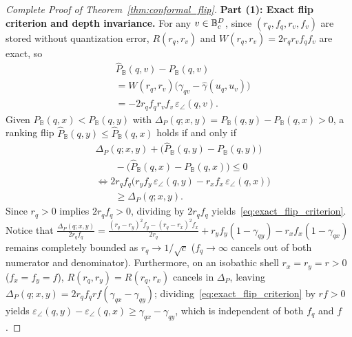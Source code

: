 \begin{proof}[Complete Proof of Theorem~\ref{thm:conformal_flip}]
\textbf{Part (1): Exact flip criterion and depth invariance.}
For any $v \in \mathbb{B}_c^D$, since $(r_q, f_q, r_v, f_v)$ are stored without quantization error, $R(r_q, r_v)$ and $W(r_q, r_v) = 2 r_q r_v f_q f_v$ are exact, so
\begin{equation}
  \begin{aligned}
    &\widehat{P}_{\mathbb{B}}(q, v) - P_{\mathbb{B}}(q, v) \\
    &= W(r_q, r_v)\bigl(\gamma_{qv} - \hat{\gamma}(u_q, u_v)\bigr) \\
    &= -2 r_q f_q r_v f_v\,\varepsilon_\angle(q, v).
  \end{aligned}
\end{equation}
Given $P_{\mathbb{B}}(q, x) < P_{\mathbb{B}}(q, y)$ with $\Delta_P(q; x, y) = P_{\mathbb{B}}(q, y) - P_{\mathbb{B}}(q, x) > 0$, a ranking flip $\widehat{P}_{\mathbb{B}}(q, y) \le \widehat{P}_{\mathbb{B}}(q, x)$ holds if and only if
\begin{equation}
  \begin{aligned}
    &\Delta_P(q; x, y) + \bigl(\widehat{P}_{\mathbb{B}}(q, y) - P_{\mathbb{B}}(q, y)\bigr) \\
    &\qquad- \bigl(\widehat{P}_{\mathbb{B}}(q, x) - P_{\mathbb{B}}(q, x)\bigr) \le 0 \\
    &\iff 2 r_q f_q\bigl(r_y f_y\,\varepsilon_\angle(q, y)
      - r_x f_x\,\varepsilon_\angle(q, x)\bigr) \\
    &\qquad\ge \Delta_P(q; x, y).
  \end{aligned}
\end{equation}
Since $r_q > 0$ implies $2 r_q f_q > 0$, dividing by $2 r_q f_q$ yields~\eqref{eq:exact_flip_criterion}.
Notice that $\frac{\Delta_P(q; x, y)}{2 r_q f_q} = \frac{(r_q - r_y)^2 f_y - (r_q - r_x)^2 f_x}{2 r_q} + r_y f_y(1 - \gamma_{qy}) - r_x f_x(1 - \gamma_{qx})$ remains completely bounded as $r_q \to 1/\sqrt{c}$ ($f_q \to \infty$ cancels out of both numerator and denominator).
Furthermore, on an isobathic shell $r_x = r_y = r > 0$ ($f_x = f_y = f$), $R(r_q, r_y) = R(r_q, r_x)$ cancels in $\Delta_P$, leaving $\Delta_P(q; x, y) = 2 r_q f_q r f (\gamma_{qx} - \gamma_{qy})$; dividing~\eqref{eq:exact_flip_criterion} by $r f > 0$ yields $\varepsilon_\angle(q, y) - \varepsilon_\angle(q, x) \ge \gamma_{qx} - \gamma_{qy}$, which is independent of both $f_q$ and $f$.


\end{proof}
